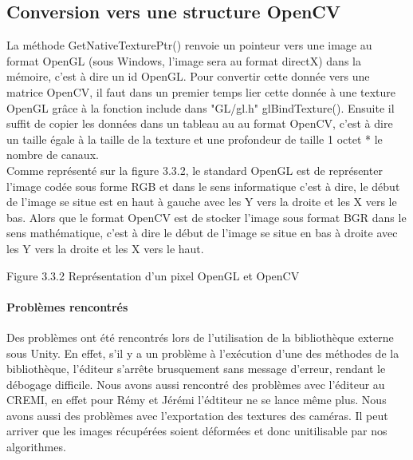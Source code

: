 \documentclass[12pt,a4paper]{report}
\begin{document}
\subsection{Conversion vers une structure OpenCV}
La méthode GetNativeTexturePtr() renvoie un pointeur vers une image au format OpenGL (sous Windows, l'image sera au format directX) dans la mémoire, c'est à dire un id OpenGL. Pour convertir cette donnée vers une matrice OpenCV, il faut dans un premier temps lier cette donnée à une texture OpenGL grâce à la fonction include dans "GL/gl.h" glBindTexture(). Ensuite il suffit de copier les données dans un tableau au au format OpenCV, c'est à dire un taille égale à la taille de la texture et une profondeur de taille 1 octet * le nombre de canaux.\\
Comme représenté sur la figure 3.3.2, le standard OpenGL est de représenter l'image codée sous forme RGB et dans le sens informatique c'est à dire, le début de l'image se situe est en haut à gauche avec les Y vers la droite et les X vers le bas. Alors que le format OpenCV est de stocker l'image sous format BGR dans le sens mathématique, c'est à dire le début de l'image se situe en bas à droite avec les Y vers la droite et les X vers le haut.\\

\begin{center}

Figure 3.3.2 Représentation d'un pixel OpenGL et OpenCV
\end{center}

\paragraph{Problèmes rencontrés}
Des problèmes ont été rencontrés lors de l'utilisation de la bibliothèque externe sous Unity. En effet, s'il y a un problème à l'exécution d'une des méthodes de la bibliothèque, l'éditeur s'arrête brusquement sans message d'erreur, rendant le débogage difficile. Nous avons aussi rencontré des problèmes avec l'éditeur au CREMI, en effet pour Rémy et Jérémi l'édtiteur ne se lance même plus. Nous avons aussi des problèmes avec l'exportation des textures des caméras. Il peut arriver que les images récupérées soient déformées et donc unitilisable par nos algorithmes.
\end{document}

